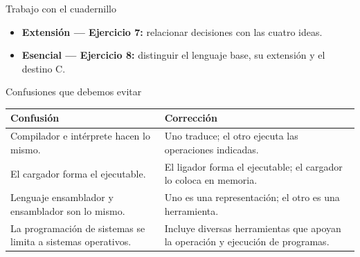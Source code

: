 \documentclass[11pt,spanish]{beamer}
\newcommand{\actividad}[1]{\textbf{\textcolor{Rojo}{#1}}}
\begin{document}
\begin{frame}{Trabajo con el cuadernillo}
\vfill

\begin{center}
\end{center}

\bigskip

\begin{itemize}
\item \textbf{Extensión --- Ejercicio 7:} relacionar decisiones con las cuatro ideas.
\item \textbf{Esencial --- Ejercicio 8:} distinguir el lenguaje base, su extensión y el destino \textsc{C}.
\end{itemize}

\vfill
\end{frame}

\begin{frame}{Confusiones que debemos evitar}
\vfill

\begin{center}
\small
\renewcommand{\arraystretch}{1.22}
\begin{tabular}{|L{.39\textwidth}|L{.46\textwidth}|}
\hline
\textbf{Confusión} & \textbf{Corrección} \tabularnewline
\hline
Compilador e intérprete hacen lo mismo. & Uno traduce; el otro ejecuta las operaciones indicadas. \tabularnewline
\hline
El cargador forma el ejecutable. & El ligador forma el ejecutable; el cargador lo coloca en memoria. \tabularnewline
\hline
Lenguaje ensamblador y ensamblador son lo mismo. & Uno es una representación; el otro es una herramienta. \tabularnewline
\hline
La programación de sistemas se limita a sistemas operativos. & Incluye diversas herramientas que apoyan la operación y ejecución de programas. \tabularnewline
\hline
\end{tabular}
\end{center}

\vfill
\end{frame}
\end{document}
